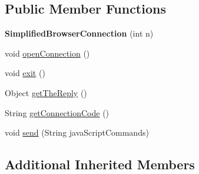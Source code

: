 \subsection*{Public Member Functions}
\begin{DoxyCompactItemize}
\item 
\hypertarget{classgov_1_1fnal_1_1ppd_1_1dd_1_1display_1_1client_1_1simplified_1_1SimplifiedBrowserConnection_a2116702cb839ef21aadd8b9f0bf638bd}{{\bfseries Simplified\-Browser\-Connection} (int n)}\label{classgov_1_1fnal_1_1ppd_1_1dd_1_1display_1_1client_1_1simplified_1_1SimplifiedBrowserConnection_a2116702cb839ef21aadd8b9f0bf638bd}

\item 
void \hyperlink{classgov_1_1fnal_1_1ppd_1_1dd_1_1display_1_1client_1_1simplified_1_1SimplifiedBrowserConnection_a37db2f6ae47eadc8e2a7c4152419f192}{open\-Connection} ()
\item 
void \hyperlink{classgov_1_1fnal_1_1ppd_1_1dd_1_1display_1_1client_1_1simplified_1_1SimplifiedBrowserConnection_abe5088032d49f2f6165f1323393bfc02}{exit} ()
\item 
Object \hyperlink{classgov_1_1fnal_1_1ppd_1_1dd_1_1display_1_1client_1_1simplified_1_1SimplifiedBrowserConnection_a855befa96ca62c59bfa892d2e3ab02a5}{get\-The\-Reply} ()
\item 
String \hyperlink{classgov_1_1fnal_1_1ppd_1_1dd_1_1display_1_1client_1_1simplified_1_1SimplifiedBrowserConnection_ad79f1d9224980458f61ab2fae978e622}{get\-Connection\-Code} ()
\item 
void \hyperlink{classgov_1_1fnal_1_1ppd_1_1dd_1_1display_1_1client_1_1simplified_1_1SimplifiedBrowserConnection_aa44d70781099fdc3cbe2266e55523c29}{send} (String java\-Script\-Commands)
\end{DoxyCompactItemize}
\subsection*{Additional Inherited Members}


